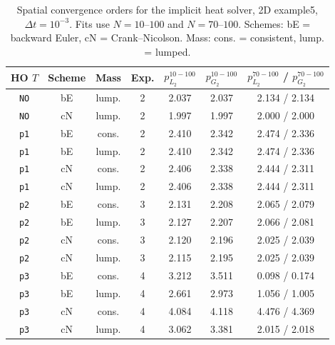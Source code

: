 \begin{table}[htbp]
\centering
\scriptsize
\caption{Spatial convergence orders for the implicit heat solver, 2D example5, $\Delta t=10^{-3}$. Fits use $N=10$--$100$ and $N=70$--$100$. Schemes: bE = backward Euler, cN = Crank--Nicolson. Mass: cons. = consistent, lump. = lumped.}
\label{tab:heat-implicit-orders-2D-1p0em03}
\begin{tabular}{ccccccc}
\toprule
HO $T$ & Scheme & Mass & Exp. & $p_{L_2}^{10-100}$ & $p_{G_2}^{10-100}$ & $p_{L_2}^{70-100}$ / $p_{G_2}^{70-100}$ \\
\midrule
\texttt{NO} & bE & lump. & 2 & 2.037 & 2.037 & 2.134 / 2.134 \\
\texttt{NO} & cN & lump. & 2 & 1.997 & 1.997 & 2.000 / 2.000 \\\hline
\texttt{p1} & bE & cons. & 2 & 2.410 & 2.342 & 2.474 / 2.336 \\
\texttt{p1} & bE & lump. & 2 & 2.410 & 2.342 & 2.474 / 2.336 \\
\texttt{p1} & cN & cons. & 2 & 2.406 & 2.338 & 2.444 / 2.311 \\
\texttt{p1} & cN & lump. & 2 & 2.406 & 2.338 & 2.444 / 2.311 \\\hline
\texttt{p2} & bE & cons. & 3 & 2.131 & 2.208 & 2.065 / 2.079 \\
\texttt{p2} & bE & lump. & 3 & 2.127 & 2.207 & 2.066 / 2.081 \\
\texttt{p2} & cN & cons. & 3 & 2.120 & 2.196 & 2.025 / 2.039 \\
\texttt{p2} & cN & lump. & 3 & 2.115 & 2.195 & 2.025 / 2.039 \\\hline
\texttt{p3} & bE & cons. & 4 & 3.212 & 3.511 & 0.098 / 0.174 \\
\texttt{p3} & bE & lump. & 4 & 2.661 & 2.973 & 1.056 / 1.005 \\
\texttt{p3} & cN & cons. & 4 & 4.084 & 4.118 & 4.476 / 4.369 \\
\texttt{p3} & cN & lump. & 4 & 3.062 & 3.381 & 2.015 / 2.018 \\
\bottomrule
\end{tabular}
\end{table}
